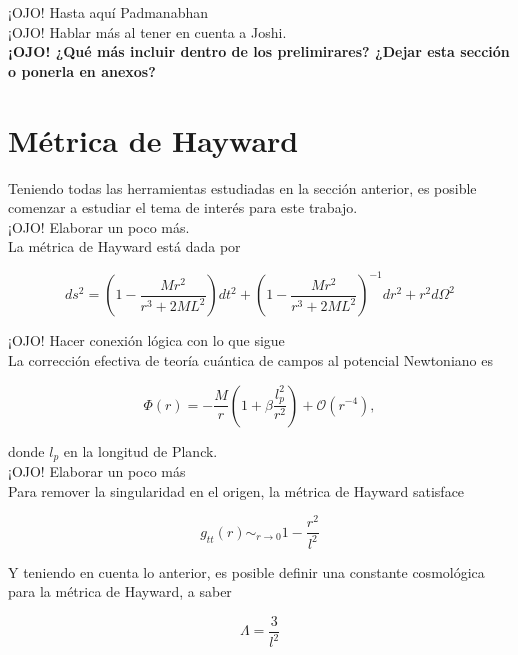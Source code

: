 \documentclass[prb,aps,preprintnumbers,amsmath,amssymb]{article}
\numberwithin{equation}{section}
\begin{document}
¡OJO! Hasta aquí Padmanabhan\\

¡OJO! Hablar más al tener en cuenta a Joshi.\\

\textbf{¡OJO! ¿Qué más incluir dentro de los prelimirares? ¿Dejar esta sección o ponerla en anexos?}\\

\section{Métrica de Hayward}

Teniendo todas las herramientas estudiadas en la sección anterior, es posible comenzar a estudiar el tema de interés para este trabajo.\\

¡OJO! Elaborar un poco más.\\

La métrica de Hayward está dada por 

\begin{equation}
ds^2 = \left( 1 - \frac{Mr^2}{r^3 + 2ML^2} \right) dt^2 + \left( 1 - \frac{Mr^2}{r^3 + 2ML^2} \right)^{-1} dr^2 + r^2d\Omega ^2
\end{equation}

¡OJO! Hacer conexión lógica con lo que sigue\\

La corrección efectiva de teoría cuántica de campos al potencial Newtoniano es

\begin{equation}
\label{new}
\Phi (r) = -\frac{M}{r} \left( 1 + \beta \frac{l_{p}^2}{r^2} \right) + \mathcal{O}(r^{-4}),
\end{equation}

donde $l_{p}$ en la longitud de Planck.\\

¡OJO! Elaborar un poco más\\

Para remover la singularidad en el origen, la métrica de Hayward satisface 

\begin{equation}
g_{tt}(r) \sim_{r \to 0} 1 - \frac{r^2}{l^2}
\end{equation}

Y teniendo en cuenta lo anterior, es posible definir una constante cosmológica para la métrica de Hayward, a saber

\begin{equation}
\Lambda = \frac{3}{l^2}
\end{equation}
\end{document}
